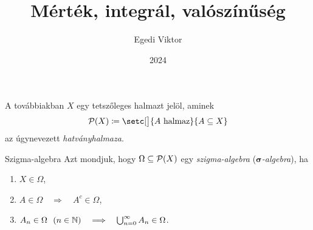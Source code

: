 \documentclass[
]{elteikthesis}[2024/04/26]
\title{Mérték, integrál, valószínűség} %
\date{2024} %
\author{Egedi Viktor}
\affiliation{egyetemi tanár} %
\begin{document}
	
	
	A továbbiakban \( X \) egy tetszőleges halmazt jelöl, aminek
	\[
		\powerset{X} \coloneq \setc[\big]{A \text{ halmaz}}{A \subseteq X}
	\]
	az úgynevezett \emph{hatványhalmaza}.
	
	\begin{definition}{Szigma-algebra}{}
		Azt mondjuk, hogy \( \Omega \subseteq \mathcal{P}( X ) \) egy \emph{szigma-algebra} 
		(\emph{\( \boldsymbol{\sigma} \)-algebra}), ha
		\begin{enumerate}[label=\( \Sigma \)\arabic*.]
			\item\label{ax:sigma-algebra-01}
			\( X \in \Omega \),
			
			\item\label{ax:sigma-algebra-02}
			\( A \in \Omega \quad \Longrightarrow \quad A^c \in \Omega \),
			
			\item\label{ax:sigma-algebra-03}
			\( A_n \in \Omega \ \ (n \in \mathbb{N}) 
			   \quad \Longrightarrow \quad 
			   \bigcup_{n=0}^{\infty} A_n \in \Omega 
			\).
		\end{enumerate}
	\end{definition}
	
\end{document}
